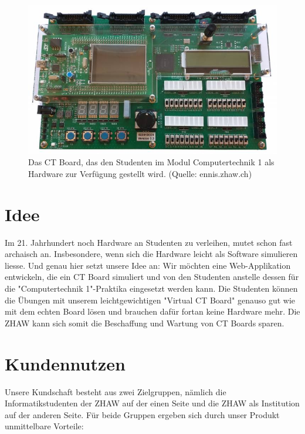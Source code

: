 \documentclass[10pt]{article}
\begin{document}
\begin{figure}[h]
\includegraphics[width=\textwidth]{ctboard}
\caption{Das CT Board, das den Studenten im Modul Computertechnik 1 als Hardware zur Verfügung gestellt wird. (Quelle: ennis.zhaw.ch)}
\label{ctboard}
\end{figure}

\section{Idee}

Im 21. Jahrhundert noch Hardware an Studenten zu verleihen, mutet schon fast archaisch an. Insbesondere, wenn sich die Hardware leicht als Software simulieren liesse. Und genau hier setzt unsere Idee an: Wir möchten eine Web-Applikation entwickeln, die ein CT Board simuliert und von den Studenten anstelle dessen für die "Computertechnik 1"-Praktika eingesetzt werden kann. Die Studenten können die Übungen mit unserem leichtgewichtigen "Virtual CT Board" genauso gut wie mit dem echten Board lösen und brauchen dafür fortan keine Hardware mehr. Die ZHAW kann sich somit die Beschaffung und Wartung von CT Boards sparen.

\section{Kundennutzen}

Unsere Kundschaft besteht aus zwei Zielgruppen, nämlich die Informatikstudenten der ZHAW auf der einen Seite und die ZHAW als Institution auf der anderen Seite. Für beide Gruppen ergeben sich durch unser Produkt unmittelbare Vorteile:
\end{document}
